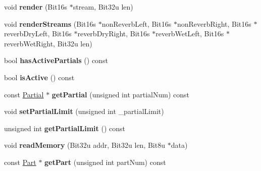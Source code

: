 \begin{DoxyCompactItemize}
\item 
\hypertarget{classMT32Emu_1_1Synth_aacfb514fc017b0345fda64604e789ee3}{void {\bfseries render} (Bit16s $\ast$stream, Bit32u len)}\label{classMT32Emu_1_1Synth_aacfb514fc017b0345fda64604e789ee3}

\item 
\hypertarget{classMT32Emu_1_1Synth_a7fb364b4ed786c936ed1f32d5b288686}{void {\bfseries render\-Streams} (Bit16s $\ast$non\-Reverb\-Left, Bit16s $\ast$non\-Reverb\-Right, Bit16s $\ast$reverb\-Dry\-Left, Bit16s $\ast$reverb\-Dry\-Right, Bit16s $\ast$reverb\-Wet\-Left, Bit16s $\ast$reverb\-Wet\-Right, Bit32u len)}\label{classMT32Emu_1_1Synth_a7fb364b4ed786c936ed1f32d5b288686}

\item 
\hypertarget{classMT32Emu_1_1Synth_aa15be06933c2f0cdc5cbe024cd4ac103}{bool {\bfseries has\-Active\-Partials} () const }\label{classMT32Emu_1_1Synth_aa15be06933c2f0cdc5cbe024cd4ac103}

\item 
\hypertarget{classMT32Emu_1_1Synth_a64e851964873f6563c4f72b392de18c2}{bool {\bfseries is\-Active} () const }\label{classMT32Emu_1_1Synth_a64e851964873f6563c4f72b392de18c2}

\item 
\hypertarget{classMT32Emu_1_1Synth_a3918ce533d2b22381daa3fce0e533e67}{const \hyperlink{classMT32Emu_1_1Partial}{Partial} $\ast$ {\bfseries get\-Partial} (unsigned int partial\-Num) const }\label{classMT32Emu_1_1Synth_a3918ce533d2b22381daa3fce0e533e67}

\item 
\hypertarget{classMT32Emu_1_1Synth_acff4d037effff4ade991ddb5f7f9397c}{void {\bfseries set\-Partial\-Limit} (unsigned int \-\_\-partial\-Limit)}\label{classMT32Emu_1_1Synth_acff4d037effff4ade991ddb5f7f9397c}

\item 
\hypertarget{classMT32Emu_1_1Synth_a373baaf76666fb03ab35c80c45de9031}{unsigned int {\bfseries get\-Partial\-Limit} () const }\label{classMT32Emu_1_1Synth_a373baaf76666fb03ab35c80c45de9031}

\item 
\hypertarget{classMT32Emu_1_1Synth_a05967518ce744420fa83491a630007c8}{void {\bfseries read\-Memory} (Bit32u addr, Bit32u len, Bit8u $\ast$data)}\label{classMT32Emu_1_1Synth_a05967518ce744420fa83491a630007c8}

\item 
\hypertarget{classMT32Emu_1_1Synth_a0eb07100db7746a7eb2393e12147db98}{const \hyperlink{classMT32Emu_1_1Part}{Part} $\ast$ {\bfseries get\-Part} (unsigned int part\-Num) const }\label{classMT32Emu_1_1Synth_a0eb07100db7746a7eb2393e12147db98}


\end{DoxyCompactItemize}
